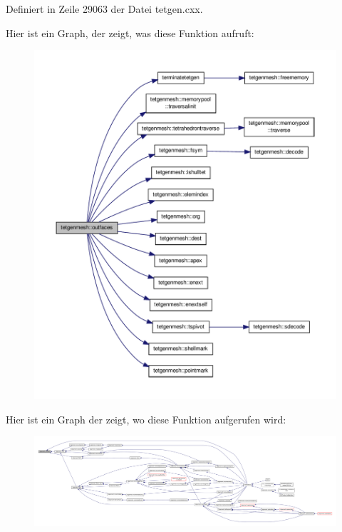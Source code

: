 Definiert in Zeile 29063 der Datei tetgen.\-cxx.



Hier ist ein Graph, der zeigt, was diese Funktion aufruft\-:
\nopagebreak
\begin{figure}[H]
\begin{center}
\leavevmode
\includegraphics[width=350pt]{classtetgenmesh_a66e4aa0af0703d1cb1a88e6d5f5a7fe6_cgraph}
\end{center}
\end{figure}




Hier ist ein Graph der zeigt, wo diese Funktion aufgerufen wird\-:
\nopagebreak
\begin{figure}[H]
\begin{center}
\leavevmode
\includegraphics[width=350pt]{classtetgenmesh_a66e4aa0af0703d1cb1a88e6d5f5a7fe6_icgraph}
\end{center}
\end{figure}


